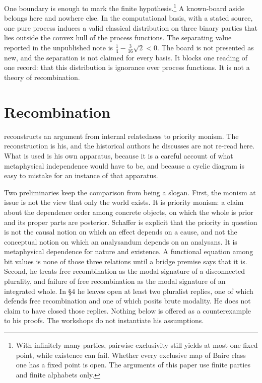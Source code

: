 \documentclass[12pt]{article}
\begin{document}
One boundary is enough to mark the finite hypothesis.\footnote{With infinitely many parties, pairwise exclusivity still yields at most one fixed point, while existence can fail. Whether every exclusive map of Baire class one has a fixed point is open. The arguments of this paper use finite parties and finite alphabets only.} A known-board aside belongs here and nowhere else. In the computational basis, with a stated source, one pure process induces a valid classical distribution on three binary parties that lies outside the convex hull of the process functions. The separating value reported in the unpublished note is \(\tfrac14-\tfrac{3}{16}\sqrt{2}<0\). The board is not presented as new, and the separation is not claimed for every basis. It blocks one reading of one record: that this distribution is ignorance over process functions. It is not a theory of recombination.

\section{Recombination}
\label{sec:rec}

\citet{schaffer2010} reconstructs an argument from internal relatedness to priority monism. The reconstruction is his, and the historical authors he discusses are not re-read here. What is used is his own apparatus, because it is a careful account of what metaphysical independence would have to be, and because a cyclic diagram is easy to mistake for an instance of that apparatus.

Two preliminaries keep the comparison from being a slogan. First, the monism at issue is not the view that only the world exists. It is priority monism: a claim about the dependence order among concrete objects, on which the whole is prior and its proper parts are posterior. Schaffer is explicit that the priority in question is not the causal notion on which an effect depends on a cause, and not the conceptual notion on which an analysandum depends on an analysans. It is metaphysical dependence for nature and existence. A functional equation among bit values is none of those three relations until a bridge premise says that it is. Second, he treats free recombination as the modal signature of a disconnected plurality, and failure of free recombination as the modal signature of an integrated whole. In \S 4 he leaves open at least two pluralist replies, one of which defends free recombination and one of which posits brute modality. He does not claim to have closed those replies. Nothing below is offered as a counterexample to his proofs. The workshops do not instantiate his assumptions.
\end{document}
